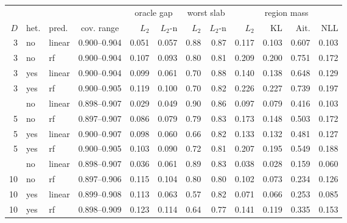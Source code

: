 \begin{tabular}{rllcrrrrrrrr}
\toprule
 & & & & \multicolumn{2}{c}{oracle gap} & \multicolumn{2}{c}{worst slab} & \multicolumn{4}{c}{region mass} \\
\cmidrule(lr){5-6} \cmidrule(lr){7-8} \cmidrule(lr){9-12}
$D$ & het. & pred. & cov. range & $L_2$ & $L_2$-n & $L_2$ & $L_2$-n & $L_2$ & KL & Ait. & NLL \\
\midrule
3 & no & linear & 0.900--0.904 & 0.051 & 0.057 & 0.88 & 0.87 & 0.117 & 0.103 & 0.607 & 0.103 \\
3 & no & rf & 0.900--0.904 & 0.107 & 0.093 & 0.80 & 0.81 & 0.209 & 0.200 & 0.751 & 0.172 \\
3 & yes & linear & 0.900--0.904 & 0.099 & 0.061 & 0.70 & 0.88 & 0.140 & 0.138 & 0.648 & 0.129 \\
3 & yes & rf & 0.900--0.905 & 0.119 & 0.100 & 0.70 & 0.82 & 0.226 & 0.227 & 0.739 & 0.197 \\
\addlinespace
5 & no & linear & 0.898--0.907 & 0.029 & 0.049 & 0.90 & 0.86 & 0.097 & 0.079 & 0.416 & 0.103 \\
5 & no & rf & 0.897--0.907 & 0.086 & 0.079 & 0.79 & 0.83 & 0.173 & 0.148 & 0.503 & 0.172 \\
5 & yes & linear & 0.900--0.907 & 0.098 & 0.060 & 0.66 & 0.82 & 0.133 & 0.132 & 0.481 & 0.127 \\
5 & yes & rf & 0.900--0.905 & 0.103 & 0.090 & 0.72 & 0.81 & 0.207 & 0.195 & 0.549 & 0.188 \\
\addlinespace
10 & no & linear & 0.898--0.907 & 0.036 & 0.061 & 0.89 & 0.83 & 0.038 & 0.028 & 0.159 & 0.060 \\
10 & no & rf & 0.897--0.906 & 0.115 & 0.104 & 0.80 & 0.80 & 0.102 & 0.073 & 0.234 & 0.126 \\
10 & yes & linear & 0.899--0.908 & 0.113 & 0.063 & 0.57 & 0.82 & 0.071 & 0.066 & 0.253 & 0.085 \\
10 & yes & rf & 0.898--0.909 & 0.123 & 0.114 & 0.64 & 0.77 & 0.141 & 0.119 & 0.335 & 0.153 \\
\bottomrule
\end{tabular}
